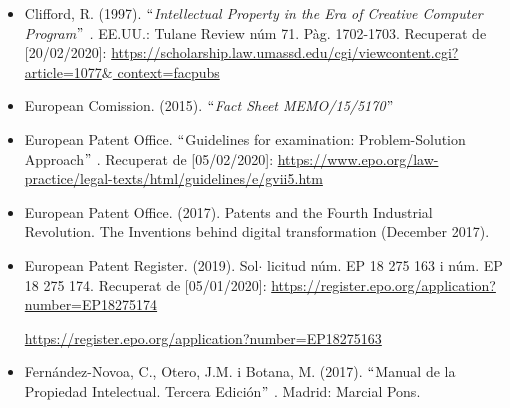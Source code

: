 \documentclass[12pt]{article}
\renewcommand{\_}{\kern-1.5pt\textunderscore\kern-1.5pt}
\begin{document}
\begin{itemize}
\begin{itemize}
\vspace{\baselineskip}
	\item Clifford, R. (1997). \textit{$``$Intellectual Property in the Era of Creative Computer Program$"$ . }EE.UU.: Tulane Review núm 71. Pàg. 1702-1703. Recuperat de [20/02/2020]: \href{https://scholarship.law.umassd.edu/cgi/viewcontent.cgi?article=1077&context=fac_pubs}{https://scholarship.law.umassd.edu/cgi/viewcontent.cgi?article=1077$\&$ context=fac\_pubs}\par


\vspace{\baselineskip}
	\item European Comission. (2015).  $``$\textit{Fact Sheet MEMO/15/5170$"$ }\par


\vspace{\baselineskip}
	\item European Patent Office. $``$Guidelines for examination: Problem-Solution Approach$"$ .\textit{ }Recuperat de [05/02/2020]: \href{https://www.epo.org/law-practice/legal-texts/html/guidelines/e/g_vii_5.htm}{https://www.epo.org/law-practice/legal-texts/html/guidelines/e/g\_vii\_5.htm}\par


\vspace{\baselineskip}
	\item European Patent Office. (2017). Patents and the Fourth Industrial Revolution. The Inventions behind digital transformation (December 2017).\par


\vspace{\baselineskip}
	\item European Patent Register. (2019). Sol$ \cdot $ licitud núm. EP 18 275 163 i núm. EP 18 275 174. Recuperat de [05/01/2020]: \href{https://register.epo.org/application?number=EP18275174}{https://register.epo.org/application?number=EP18275174} \par

\href{https://register.epo.org/application?number=EP18275163}{https://register.epo.org/application?number=EP18275163}\par


\vspace{\baselineskip}
	\item Fernández-Novoa, C., Otero, J.M. i Botana, M. (2017). $``$Manual de la Propiedad Intelectual. Tercera Edición$"$ . Madrid: Marcial Pons. \par



\end{itemize}
\end{itemize}
\end{document}
